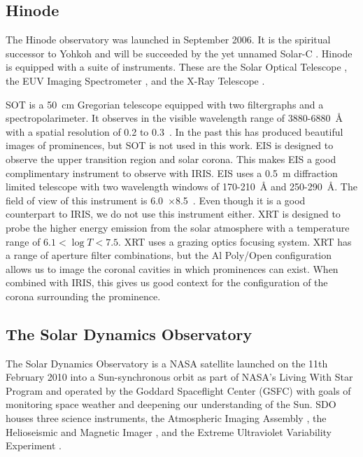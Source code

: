 \subsection{Hinode}
The Hinode observatory \citep[formerly known as Solar-B; ][]{kosugi_hinode_2007} was launched in September 2006. It is the spiritual successor to Yohkoh  \citep[formerly known as Solar-A; ][]{ogawara_solar-mission_1991} and will be succeeded by the yet unnamed Solar-C \citep{shimizu_solar-c_euvst_2019}. Hinode is equipped with a suite of instruments. These are the Solar Optical Telescope \citep[SOT; ][]{suematsu_solar_2008}, the EUV Imaging Spectrometer \citep[EIS; ][]{culhane_euv_2007}, and the X-Ray Telescope \citep[XRT; ][]{golub_x-ray_2007}. 

SOT is a 50~cm Gregorian telescope equipped with two filtergraphs and a spectropolarimeter. It observes in the visible wavelength range of 3880-6880~\AA{} with a spatial resolution of 0.2 to 0.3~\arcsec. In the past this has produced beautiful images of prominences, but SOT is not used in this work. EIS is designed to observe the upper transition region and solar corona. This makes EIS a good complimentary instrument to observe with IRIS. EIS uses a 0.5~m diffraction limited telescope with two wavelength windows of 170-210~\AA{} and 250-290~\AA. The field of view of this instrument is 6.0~\arcmin$\times$8.5~\arcmin. Even though it is a good counterpart to IRIS, we do not use this instrument either. XRT is designed to probe the higher energy emission from the solar atmosphere with a temperature range of $6.1<\log T<7.5$. XRT uses a grazing optics focusing system. XRT has a range of aperture filter combinations, but the Al Poly/Open configuration allows us to image the coronal cavities in which prominences can exist. When combined with IRIS, this gives us good context for the configuration of the corona surrounding the prominence.

\subsection{The Solar Dynamics Observatory}

The Solar Dynamics Observatory \citep[SDO; ][]{pesnell_solar_2012} is a NASA satellite launched on the 11th February 2010 into a Sun-synchronous orbit as part of NASA's Living With Star Program and operated by the Goddard Spaceflight Center (GSFC) with goals of monitoring space weather and deepening our understanding of the Sun. SDO houses three science instruments, the Atmospheric Imaging Assembly \citep[AIA; ][]{lemen_atmospheric_2012}, the Helioseismic and Magnetic Imager \citep[HMI;][]{scherrer_helioseismic_2012}, and the Extreme Ultraviolet Variability Experiment \citep[EVE; ][]{woods_extreme_2012}.

